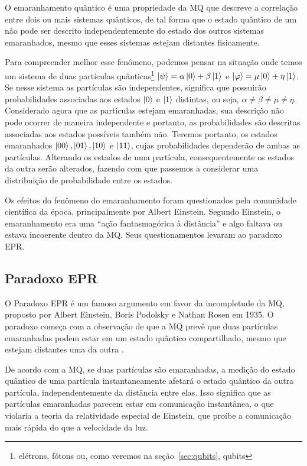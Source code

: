 O emaranhamento quântico é uma propriedade da MQ que descreve a correlação entre dois ou mais sistemas quânticos, de tal forma que o estado quântico de um  não pode ser descrito independentemente do estado dos outros sistemas emaranhados, mesmo que esses sistemas estejam distantes fisicamente.

Para compreender melhor esse fenômeno, podemos pensar na situação onde temos um sistema de duas partículas quânticas\footnote{elétrons, fótons ou, como veremos na seção~\ref{sec:qubits}, qubits} $\ket{\psi}=\alpha\ket{0}+\beta\ket{1}$ e $\ket{\varphi}=\mu\ket{0}+\eta\ket{1}$. Se nesse sistema as partículas são independentes, significa que possuirão probabilidades associadas aos estados $\ket{0}$ e $\ket{1}$ distintas, ou seja, $\alpha \neq \beta \neq \mu \neq \eta$. Considerado agora que as partículas estejam emaranhadas, sua descrição não pode ocorrer de maneira independente e portanto, as probabilidades são descritas associadas aos estados possíveis também não. Teremos portanto, os estados emaranhados $\ket{00}, \ket{01}, \ket{10}$ e $\ket{11}$, cujas probabilidades dependerão de ambas as partículas. Alterando os estados de uma partícula, consequentemente os estados da outra serão alterados, fazendo com que passemos a considerar uma distribuição de probabilidade entre os estados.  

Os efeitos do fenômeno do emaranhamento foram questionados pela comunidade científica da época, principalmente por Albert Einstein. Segundo Einstein, o emaranhamento era uma ``ação fantasmagórica à distância'' e algo faltava ou estava incoerente dentro da MQ. Seus questionamentos levaram ao paradoxo EPR.

\subsection{Paradoxo EPR}\label{sec:epr}

O Paradoxo EPR é um famoso argumento em favor da incompletude da MQ, proposto por Albert Einstein, Boris Podolsky e Nathan Rosen em 1935. O paradoxo começa com a observação de que a MQ prevê que duas partículas emaranhadas podem estar em um estado quântico compartilhado, mesmo que estejam distantes uma da outra \cite{epr}.

De acordo com a MQ, se duas partículas são emaranhadas, a medição do estado quântico de uma partícula instantaneamente afetará o estado quântico da outra partícula, independentemente da distância entre elas. Isso significa que as partículas emaranhadas parecem estar em comunicação instantânea, o que violaria a teoria da relatividade especial de Einstein, que proíbe a comunicação mais rápida do que a velocidade da luz.

